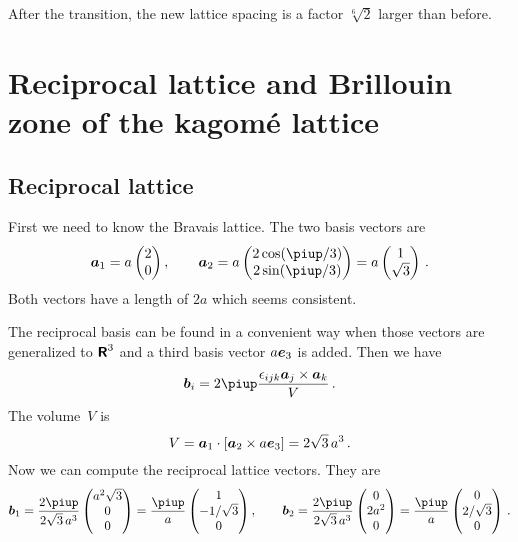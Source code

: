 \documentclass[11pt, english, fleqn, DIV=15, headinclude, BCOR=1cm]{scrartcl}
\begin{document}
After the transition, the new lattice spacing is a factor $\sqrt[6] 2$ larger
than before.

\section{Reciprocal lattice and Brillouin zone of the kagomé lattice}
\label{homework:2}

\subsection{Reciprocal lattice}

First we need to know the Bravais lattice. The two basis vectors are
\[
    \vec a_1 =
    a
    \begin{pmatrix}
        2 \\ 0
    \end{pmatrix}
    \eqnsep
    \vec a_2 =
    a
    \begin{pmatrix}
        2 \cos(\piup/3) \\
        2 \sin(\piup/3)
    \end{pmatrix}
    =
    a
    \begin{pmatrix}
        1 \\ \sqrt{3}
    \end{pmatrix} \,.
\]
Both vectors have a length of $2a$ which seems consistent.

The reciprocal basis can be found in a convenient way when those vectors are
generalized to $\text{\bfseries\sffamily R}^3$ and a third basis vector $a\ev_3$ is added. Then we have
\[
    \vec b_i = 2\piup \frac{\epsilon_{ijk} \vec a_j \times \vec a_k}{V} \,.
\]
The volume~$V$ is
\[
    V = \vec a_1 \cdot [\vec a_2 \times a\ev_3]
    = 2 \sqrt 3 \, a^3 \,.
\]
Now we can compute the reciprocal lattice vectors. They are
\[
    \vec b_1 = \frac{2 \piup}{2 \sqrt 3 \, a^3}
    \begin{pmatrix}
        a^2 \sqrt 3 \\ 0 \\ 0
    \end{pmatrix}
    =
    \frac{\piup}{a}
    \begin{pmatrix}
        1 \\ - 1 / \sqrt 3 \\ 0
    \end{pmatrix}
    \eqnsep
    \vec b_2 = \frac{2 \piup}{2 \sqrt 3 \, a^3}
    \begin{pmatrix}
        0 \\ 2a^2 \\ 0
    \end{pmatrix}
    =
    \frac{\piup}{a}
    \begin{pmatrix}
        0 \\ 2 / \sqrt 3 \\ 0
    \end{pmatrix} \,.
\]
\end{document}
